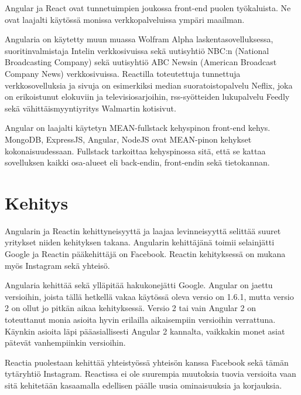 \documentclass[a4paper,12pt,twoside]{article} %
\begin{document}
\vspace{4mm}\noindent Angular ja React ovat tunnetuimpien joukossa front-end puolen työkaluista. Ne ovat laajalti käytössä monissa verkkopalveluissa ympäri maailman.

\vspace{4mm}\noindent Angularia on käytetty muun muassa Wolfram Alpha laskentasovelluksessa\cite{angularlist}, suoritinvalmistaja Intelin verkkosivuissa sekä uutisyhtiö NBC:n (National Broadcasting Company) sekä uutisyhtiö ABC Newsin (American Broadcast Company News) verkkosivuissa.\cite{angularwikipedia} Reactilla toteutettuja tunnettuja verkkosovelluksia ja sivuja on esimerkiksi median suoratoistopalvelu Neflix, joka on erikoistunut elokuviin ja televisiosarjoihin, rss-syötteiden lukupalvelu Feedly sekä vähittäismyyntiyritys Walmartin kotisivut. \cite{reactlist}

\vspace{4mm}\noindent Angular on laajalti käytetyn MEAN-fullstack kehyspinon front-end kehys. MongoDB, ExpressJS, Angular, NodeJS ovat MEAN-pinon kehykset kokonaisuudessaan. Fullstack tarkoittaa kehyspinossa sitä, että se kattaa sovelluksen kaikki osa-alueet eli back-endin, front-endin sekä tietokannan.

\newpage


\section{Kehitys}

Angularin ja Reactin kehittyneisyyttä ja laajaa levinneisyyttä selittää suuret yritykset niiden kehityksen takana. Angularin kehittäjänä toimii selainjätti Google ja Reactin pääkehittäjä on Facebook. Reactin kehityksessä on mukana myös Instagram sekä yhteisö.

\vspace{4mm}\noindent Angularia kehittää sekä ylläpitää hakukonejätti Google. Angular on jaettu versioihin, joista tällä hetkellä vakaa käytössä oleva versio on 1.6.1, mutta versio 2 on ollut jo pitkän aikaa kehityksessä. Versio 2 tai vain Angular 2 on toteuttanut monia asioita hyvin erilailla aikaisempiin versioihin verrattuna. Käynkin asioita läpi pääasiallisesti Angular 2 kannalta, vaikkakin monet asiat pätevät vanhempiinkin versioihin.

\vspace{4mm}\noindent
Reactia puolestaan kehittää yhteistyössä yhteisön kanssa Facebook sekä tämän tytäryhtiö Instagram. Reactissa ei ole suurempia muutoksia tuovia versioita vaan sitä kehitetään kasaamalla edellisen päälle uusia ominaisuuksia ja korjauksia.
\end{document}
